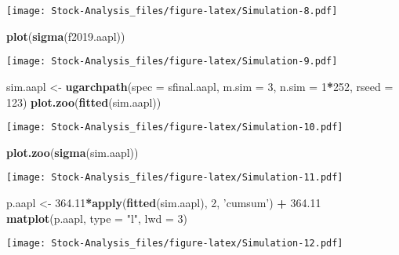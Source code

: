 \documentclass[
]{article}
\newenvironment{Shaded}{\begin{snugshade}}{\end{snugshade}}
\newcommand{\DataTypeTok}[1]{\textcolor[rgb]{0.13,0.29,0.53}{#1}}
\newcommand{\DecValTok}[1]{\textcolor[rgb]{0.00,0.00,0.81}{#1}}
\newcommand{\FloatTok}[1]{\textcolor[rgb]{0.00,0.00,0.81}{#1}}
\newcommand{\KeywordTok}[1]{\textcolor[rgb]{0.13,0.29,0.53}{\textbf{#1}}}
\newcommand{\NormalTok}[1]{#1}
\newcommand{\OperatorTok}[1]{\textcolor[rgb]{0.81,0.36,0.00}{\textbf{#1}}}
\newcommand{\StringTok}[1]{\textcolor[rgb]{0.31,0.60,0.02}{#1}}
\begin{document}
\texttt{[image: Stock-Analysis\_files/figure-latex/Simulation-8.pdf]}

\begin{Shaded}
\begin{Highlighting}[]
\KeywordTok{plot}\NormalTok{(}\KeywordTok{sigma}\NormalTok{(f2019.aapl))}
\end{Highlighting}
\end{Shaded}

\texttt{[image: Stock-Analysis\_files/figure-latex/Simulation-9.pdf]}

\begin{Shaded}
\begin{Highlighting}[]
\NormalTok{sim.aapl <-}\StringTok{ }\KeywordTok{ugarchpath}\NormalTok{(}\DataTypeTok{spec =}\NormalTok{ sfinal.aapl,}
                  \DataTypeTok{m.sim =} \DecValTok{3}\NormalTok{,}
                  \DataTypeTok{n.sim =} \DecValTok{1}\OperatorTok{*}\DecValTok{252}\NormalTok{,}
                  \DataTypeTok{rseed =} \DecValTok{123}\NormalTok{)}
\KeywordTok{plot.zoo}\NormalTok{(}\KeywordTok{fitted}\NormalTok{(sim.aapl))}
\end{Highlighting}
\end{Shaded}

\texttt{[image: Stock-Analysis\_files/figure-latex/Simulation-10.pdf]}

\begin{Shaded}
\begin{Highlighting}[]
\KeywordTok{plot.zoo}\NormalTok{(}\KeywordTok{sigma}\NormalTok{(sim.aapl))}
\end{Highlighting}
\end{Shaded}

\texttt{[image: Stock-Analysis\_files/figure-latex/Simulation-11.pdf]}

\begin{Shaded}
\begin{Highlighting}[]
\NormalTok{p.aapl <-}\StringTok{ }\FloatTok{364.11}\OperatorTok{*}\KeywordTok{apply}\NormalTok{(}\KeywordTok{fitted}\NormalTok{(sim.aapl), }\DecValTok{2}\NormalTok{, }\StringTok{'cumsum'}\NormalTok{) }\OperatorTok{+}\StringTok{ }\FloatTok{364.11}
\KeywordTok{matplot}\NormalTok{(p.aapl, }\DataTypeTok{type =} \StringTok{"l"}\NormalTok{, }\DataTypeTok{lwd =} \DecValTok{3}\NormalTok{)}
\end{Highlighting}
\end{Shaded}

\texttt{[image: Stock-Analysis\_files/figure-latex/Simulation-12.pdf]}
\end{document}
